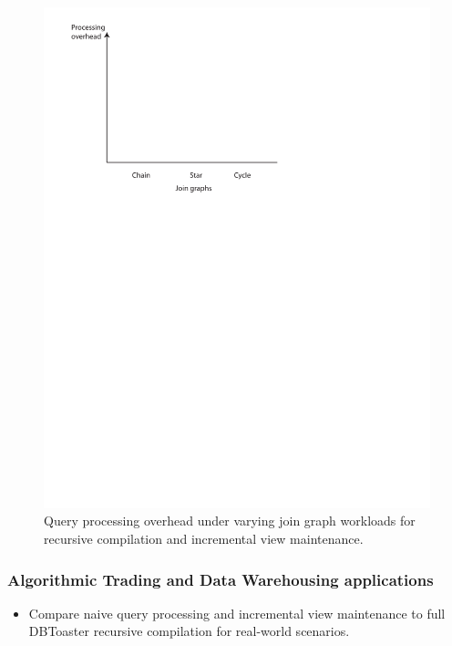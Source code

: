 {\begin{figure}
\includegraphics[scale=0.6]{figures/axes-jgraph.pdf}
\caption{Query processing overhead under varying join graph workloads for
recursive compilation and incremental view maintenance.}
\label{fig:overhead-workload-join}
\end{figure}

\subsubsection{Algorithmic Trading and Data Warehousing applications}

\begin{itemize}
\item Compare naive query processing and incremental view maintenance to full
DBToaster recursive compilation for real-world scenarios.
\end{itemize}

}

